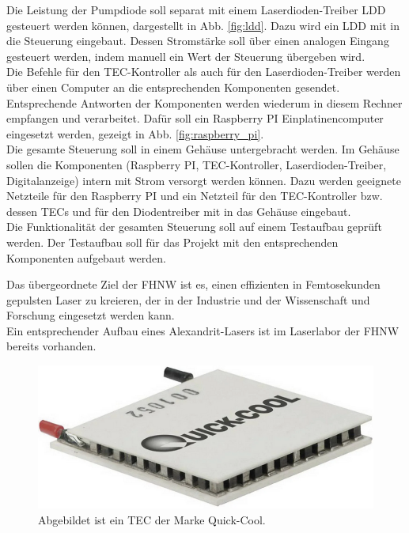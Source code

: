 Die Leistung der Pumpdiode soll separat mit einem Laserdioden-Treiber LDD gesteuert werden können, dargestellt in Abb. \ref{fig:ldd}. Dazu wird ein LDD mit in die Steuerung eingebaut. Dessen Stromstärke soll über einen analogen Eingang gesteuert werden, indem manuell ein Wert der Steuerung übergeben wird.\\
Die Befehle für den TEC-Kontroller als auch für den Laserdioden-Treiber werden über einen Computer an die entsprechenden Komponenten gesendet. Entsprechende Antworten der Komponenten werden wiederum in diesem Rechner empfangen und verarbeitet. Dafür soll ein Raspberry PI Einplatinencomputer eingesetzt werden, gezeigt in Abb. \ref{fig:raspberry_pi}.\\

Die gesamte Steuerung soll in einem Gehäuse untergebracht werden. Im Gehäuse sollen die Komponenten  (Raspberry PI, TEC-Kontroller, Laserdioden-Treiber, Digitalanzeige) intern mit Strom versorgt werden können. Dazu werden geeignete Netzteile für den Raspberry PI und ein Netzteil für den TEC-Kontroller bzw. dessen TECs und für den Diodentreiber mit in das Gehäuse eingebaut.\\
Die Funktionalität der gesamten Steuerung soll auf einem Testaufbau geprüft werden. Der Testaufbau soll für das Projekt mit den entsprechenden Komponenten aufgebaut werden.\\
\label{chptr:_einleitung}

Das übergeordnete Ziel der FHNW ist es, einen effizienten in Femtosekunden gepulsten Laser zu kreieren, der in der Industrie und der Wissenschaft und Forschung eingesetzt werden kann.\\
Ein entsprechender Aufbau eines Alexandrit-Lasers ist im Laserlabor der FHNW bereits vorhanden.\\

\begin{figure}[H]
    \centering
    \includegraphics[scale=0.5]{98_images/peltier_modul.PNG}
    \caption{Abgebildet ist ein TEC der Marke Quick-Cool.}
    \label{fig:peltierelement}
\end{figure}

